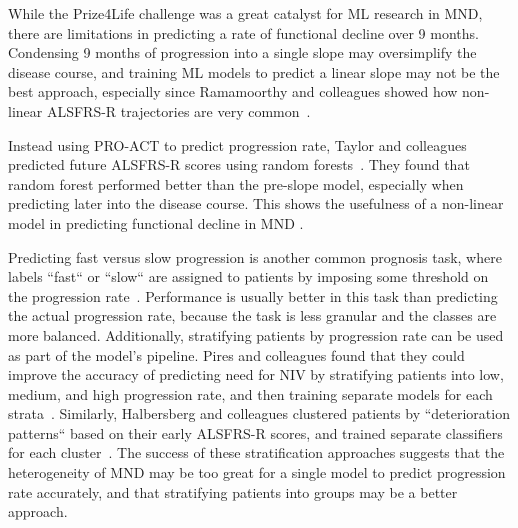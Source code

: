 While the Prize4Life challenge was a great catalyst for ML research in MND, there are limitations in predicting a rate of functional decline over 9 months.
Condensing 9 months of progression into a single slope may oversimplify the disease course, and training ML models to predict a linear slope may not be the best approach, especially since Ramamoorthy and colleagues showed how non-linear ALSFRS-R trajectories are very common~\cite{ramamoorthyIdentifyingPatternsAmyotrophic2022}.


Instead using PRO-ACT to predict progression rate, Taylor and colleagues predicted future ALSFRS-R scores using random forests~\cite{taylorPredictingDiseaseProgression2016}.
They found that random forest performed better than the pre-slope model, especially when predicting later into the disease course.
This shows the usefulness of a non-linear model in predicting functional decline in MND .

Predicting fast versus slow progression is another common prognosis task, where labels ``fast`` or ``slow`` are assigned to patients by imposing some threshold on the progression rate~\cite{ongPredictingFunctionalDecline2017, dinabduljabbarPredictingAmyotrophicLateral2023}.
Performance is usually better in this task than predicting the actual progression rate, because the task is less granular and the classes are more balanced.
Additionally, stratifying patients by progression rate can be used as part of the model's pipeline.
Pires and colleagues found that they could improve the accuracy of predicting need for NIV by stratifying patients into low, medium, and high progression rate, and then training separate models for each strata~\cite{piresPredictingNoninvasiveVentilation2018}.
Similarly, Halbersberg and colleagues clustered patients by ``deterioration patterns`` based on their early ALSFRS-R scores, and trained separate classifiers for each cluster~\cite{halbersbergTemporalModelingDeterioration2019}.
The success of these stratification approaches suggests that the heterogeneity of MND may be too great for a single model to predict progression rate accurately, and that stratifying patients into groups may be a better approach.


